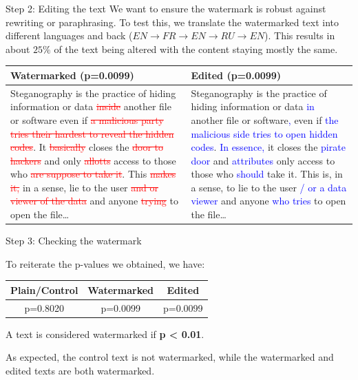 \begin{frame}{Step 2: Editing the text}
    We want to ensure the watermark is robust against rewriting or paraphrasing.
    To test this, we translate the watermarked text into different languages and back
    ($EN \rightarrow FR \rightarrow EN \rightarrow RU \rightarrow EN$). This results in about $25\%$ of the text being altered with the content staying mostly the same.

    \scriptsize
    \begin{tabular}{p{} p{}}
        \textbf{Watermarked (p=0.0099)} & \textbf{Edited (p=0.0099)}  \\\hline

        Steganography is the practice of hiding information or data
        \textcolor{red}{\sout{inside}} another file or software
        even if \textcolor{red}{\sout{a malicious party tries their hardest to reveal the hidden codes}}.
        It \textcolor{red}{\sout{basically}} closes the \textcolor{red}{\sout{door to hackers}}
        and only \textcolor{red}{\sout{allotts}} access to those who
        \textcolor{red}{\sout{are suppose to take it}}.
        This \textcolor{red}{\sout{makes it,}} in a sense, lie to the user
        \textcolor{red}{\sout{and or viewer of the data}} and anyone
        \textcolor{red}{\sout{trying}} to open the file\ldots
                                        &
        Steganography is the practice of hiding information or data
        \textcolor{blue}{in} another file or software\textcolor{blue}{,}
        even if \textcolor{blue}{the malicious side tries to open hidden codes}.
        \textcolor{blue}{In essence,} it closes the \textcolor{blue}{pirate door}
        and \textcolor{blue}{attributes} only access to those who \textcolor{blue}{should} take it.
        This is, in a sense, to lie to the user \textcolor{blue}{/ or a data viewer}
        and anyone \textcolor{blue}{who tries} to open the file\ldots \\
    \end{tabular}
\end{frame}


\begin{frame}{Step 3: Checking the watermark}

    To reiterate the p-values we obtained, we have:

    \begin{center}

        \begin{tabular}{ccc}
            \textbf{Plain/Control} & \textbf{Watermarked} & \textbf{Edited} \\
            \hline
            p=0.8020               & p=0.0099             & p=0.0099
        \end{tabular}
    \end{center}

    \bigskip

    A text is considered watermarked if \textbf{p < 0.01}.

    As expected, the control text is not watermarked, while the watermarked and edited texts are both watermarked.
\end{frame}